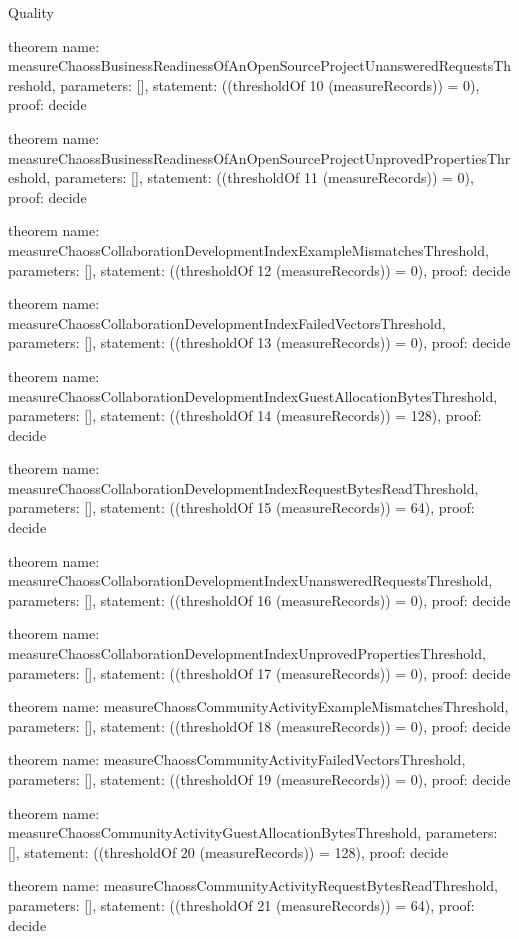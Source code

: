 \begin{lexlean}{Quality}
\begin{semanticmodule}
theorem{
  name: measureChaossBusinessReadinessOfAnOpenSourceProjectUnansweredRequestsThreshold,
  parameters: [],
  statement: ((thresholdOf 10 (measureRecords)) = 0),
  proof: decide{}
}

theorem{
  name: measureChaossBusinessReadinessOfAnOpenSourceProjectUnprovedPropertiesThreshold,
  parameters: [],
  statement: ((thresholdOf 11 (measureRecords)) = 0),
  proof: decide{}
}

theorem{
  name: measureChaossCollaborationDevelopmentIndexExampleMismatchesThreshold,
  parameters: [],
  statement: ((thresholdOf 12 (measureRecords)) = 0),
  proof: decide{}
}

theorem{
  name: measureChaossCollaborationDevelopmentIndexFailedVectorsThreshold,
  parameters: [],
  statement: ((thresholdOf 13 (measureRecords)) = 0),
  proof: decide{}
}

theorem{
  name: measureChaossCollaborationDevelopmentIndexGuestAllocationBytesThreshold,
  parameters: [],
  statement: ((thresholdOf 14 (measureRecords)) = 128),
  proof: decide{}
}

theorem{
  name: measureChaossCollaborationDevelopmentIndexRequestBytesReadThreshold,
  parameters: [],
  statement: ((thresholdOf 15 (measureRecords)) = 64),
  proof: decide{}
}

theorem{
  name: measureChaossCollaborationDevelopmentIndexUnansweredRequestsThreshold,
  parameters: [],
  statement: ((thresholdOf 16 (measureRecords)) = 0),
  proof: decide{}
}

theorem{
  name: measureChaossCollaborationDevelopmentIndexUnprovedPropertiesThreshold,
  parameters: [],
  statement: ((thresholdOf 17 (measureRecords)) = 0),
  proof: decide{}
}

theorem{
  name: measureChaossCommunityActivityExampleMismatchesThreshold,
  parameters: [],
  statement: ((thresholdOf 18 (measureRecords)) = 0),
  proof: decide{}
}

theorem{
  name: measureChaossCommunityActivityFailedVectorsThreshold,
  parameters: [],
  statement: ((thresholdOf 19 (measureRecords)) = 0),
  proof: decide{}
}

theorem{
  name: measureChaossCommunityActivityGuestAllocationBytesThreshold,
  parameters: [],
  statement: ((thresholdOf 20 (measureRecords)) = 128),
  proof: decide{}
}

theorem{
  name: measureChaossCommunityActivityRequestBytesReadThreshold,
  parameters: [],
  statement: ((thresholdOf 21 (measureRecords)) = 64),
  proof: decide{}
}


\end{semanticmodule}
\end{lexlean}
